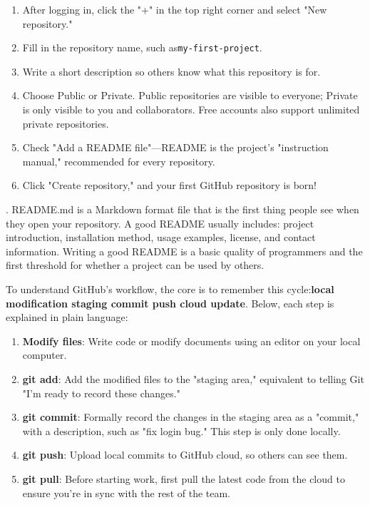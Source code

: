 
\begin{enumerate}
  \item After logging in, click the "+" in the top right corner and select "New repository."
  \item Fill in the repository name, such as\texttt{my-\allowbreak first-\allowbreak project}.
  \item Write a short description so others know what this repository is for.
  \item Choose Public or Private. Public repositories are visible to everyone; Private is only visible to you and collaborators. Free accounts also support unlimited private repositories.
  \item Check "Add a README file"—README is the project's "instruction manual," recommended for every repository.
  \item Click "Create repository," and your first GitHub repository is born!
\end{enumerate}

\begin{tcbinfo}{.}
README.md is a Markdown format file that is the first thing people see when they open your repository. A good README usually includes: project introduction, installation method, usage examples, license, and contact information. Writing a good README is a basic quality of programmers and the first threshold for whether a project can be used by others.

\end{tcbinfo}


To understand GitHub's workflow, the core is to remember this cycle:\textbf{local modification staging commit push cloud update}. Below, each step is explained in plain language:

\begin{enumerate}
  \item \textbf{Modify files}: Write code or modify documents using an editor on your local computer.
  \item \textbf{git add}: Add the modified files to the "staging area," equivalent to telling Git "I'm ready to record these changes."
  \item \textbf{git commit}: Formally record the changes in the staging area as a "commit," with a description, such as "fix login bug." This step is only done locally.
  \item \textbf{git push}: Upload local commits to GitHub cloud, so others can see them.
  \item \textbf{git pull}: Before starting work, first pull the latest code from the cloud to ensure you're in sync with the rest of the team.
\end{enumerate}

